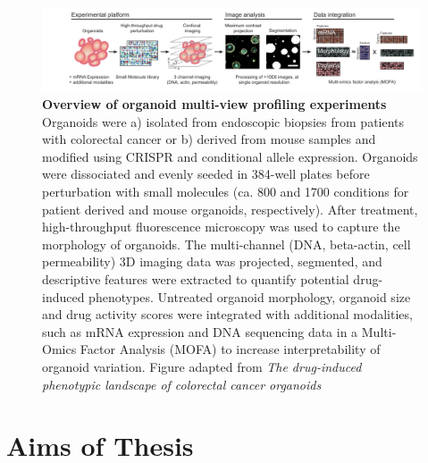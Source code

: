 \begin{flushleft}
\begin{figure}[h]
\centering
\includegraphics[width=\textwidth,
                height=\textheight,
                keepaspectratio]{figures/promise/pdf/fig_1_1_1.pdf}
\caption[Overview of organoid multi-view profiling experiments]{\textbf{Overview of organoid multi-view profiling experiments} Organoids were a) isolated from endoscopic biopsies from patients with colorectal cancer or b) derived from mouse samples and modified using CRISPR and conditional allele expression. Organoids were dissociated and evenly seeded in 384-well plates before perturbation with small molecules (ca. 800 and 1700 conditions for patient derived and mouse organoids, respectively). After treatment, high-throughput fluorescence microscopy was used to capture the morphology of organoids.  The multi-channel (DNA, beta-actin, cell permeability) 3D imaging data was projected, segmented, and descriptive features were extracted to quantify potential drug-induced phenotypes. Untreated organoid morphology, organoid size and drug activity scores were integrated with additional modalities, such as mRNA expression and DNA sequencing data in a Multi-Omics Factor Analysis (MOFA) to increase interpretability of organoid variation. Figure adapted from \textit{The drug-induced phenotypic landscape of colorectal cancer organoids} \citep{betgeDruginducedPhenotypicLandscape2022}}
\label{fig_130}
\end{figure}

\newpage
\section{Aims of Thesis}


\end{flushleft}
